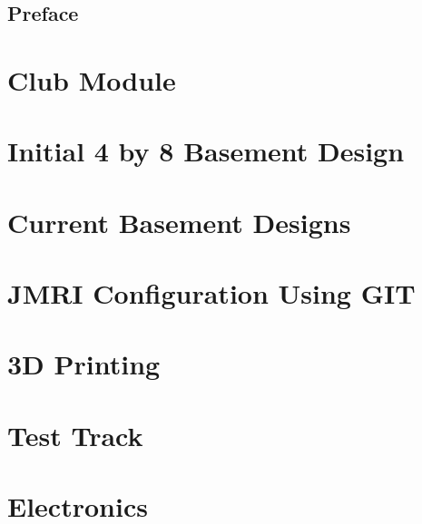 \documentclass[12pt,twoside]{book}
\begin{document}
\frontmatter
\pagestyle{empty}


\dominitoc
\tableofcontents
\listoftables
\listoffigures
\chapter{Preface}

\mainmatter
\pagestyle{protocol}
\part{Club Module}



\part{Initial 4 by 8 Basement Design}


\part{Current Basement Designs}


\part{JMRI Configuration Using GIT}


\part{3D Printing}


\part{Test Track}


\part{Electronics}




\backmatter
{}
\footnotesize
\printindex
\normalsize
{}
\end{document}
